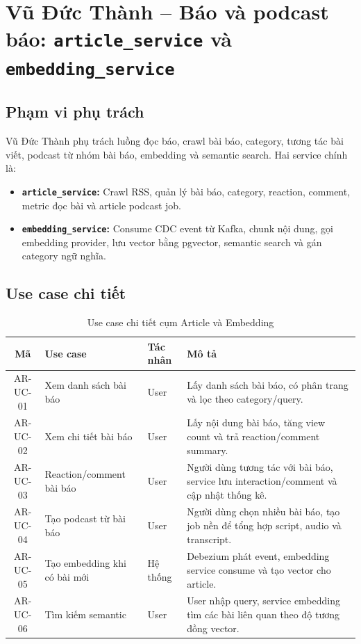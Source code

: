 \documentclass[14pt,a4paper,oneside]{extreport}
\begin{document}
\section{Vũ Đức Thành -- Báo và podcast báo: \texttt{article\_service} và \texttt{embedding\_service}}
\label{sec:phase3-article-embedding}

\subsection{Phạm vi phụ trách}

Vũ Đức Thành phụ trách luồng đọc báo, crawl bài báo, category, tương tác bài viết, podcast từ nhóm bài báo, embedding và semantic search. Hai service chính là:

\begin{itemize}[leftmargin=2cm]
  \item \textbf{\texttt{article\_service}:} Crawl RSS, quản lý bài báo, category, reaction, comment, metric đọc bài và article podcast job.
  \item \textbf{\texttt{embedding\_service}:} Consume CDC event từ Kafka, chunk nội dung, gọi embedding provider, lưu vector bằng pgvector, semantic search và gán category ngữ nghĩa.
\end{itemize}

\subsection{Use case chi tiết}

\begin{table}[H]
\centering
\caption{Use case chi tiết cụm Article và Embedding}
\label{tab:uc-article-embedding}
\renewcommand{\arraystretch}{1.3}
\small
\begin{tabularx}{\textwidth}{|c|l|l|X|}
\hline
\textbf{Mã} & \textbf{Use case} & \textbf{Tác nhân} & \textbf{Mô tả} \\
\hline
AR-UC-01 & Xem danh sách bài báo & User & Lấy danh sách bài báo, có phân trang và lọc theo category/query. \\
\hline
AR-UC-02 & Xem chi tiết bài báo & User & Lấy nội dung bài báo, tăng view count và trả reaction/comment summary. \\
\hline
AR-UC-03 & Reaction/comment bài báo & User & Người dùng tương tác với bài báo, service lưu interaction/comment và cập nhật thống kê. \\
\hline
AR-UC-04 & Tạo podcast từ bài báo & User & Người dùng chọn nhiều bài báo, tạo job nền để tổng hợp script, audio và transcript. \\
\hline
AR-UC-05 & Tạo embedding khi có bài mới & Hệ thống & Debezium phát event, embedding service consume và tạo vector cho article. \\
\hline
AR-UC-06 & Tìm kiếm semantic & User & User nhập query, service embedding tìm các bài liên quan theo độ tương đồng vector. \\
\hline
\end{tabularx}
\end{table}
\end{document}
